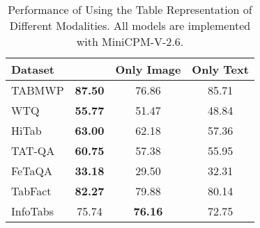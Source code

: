 \begin{table}[t]
\small
  \centering
  \begin{tabular}{l|ccc}
    \hline
    \textbf{Dataset} & \textbf{\method{}} & \textbf{Only Image} & \textbf{Only Text} \\
    \hline
    TABMWP  & \textbf{87.50} & 76.86 & 85.71 \\
    WTQ     & \textbf{55.77} & 51.47 & 48.84 \\
    HiTab   & \textbf{63.00} & 62.18 & 57.36 \\
    TAT-QA  & \textbf{60.75} & 57.38 & 55.95 \\
    FeTaQA  & \textbf{33.18} & 29.50 & 32.31 \\
    \hline
    TabFact  & \textbf{82.27} & 79.88 & 80.14 \\
    InfoTabs & 75.74 & \textbf{76.16 }& 72.75 \\
    \hline
  \end{tabular}
  \caption{\label{tab:ablation_hippo}Performance of \method{} Using the Table Representation of Different Modalities. All models are implemented with MiniCPM-V-2.6.}
\end{table}
